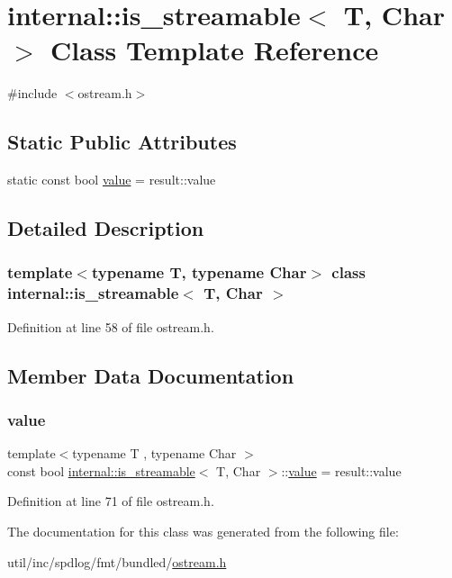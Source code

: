\hypertarget{classinternal_1_1is__streamable}{}\section{internal\+:\+:is\+\_\+streamable$<$ T, Char $>$ Class Template Reference}
\label{classinternal_1_1is__streamable}


{\ttfamily \#include $<$ostream.\+h$>$}

\subsection*{Static Public Attributes}
\begin{DoxyCompactItemize}
\item 
static const bool \hyperlink{classinternal_1_1is__streamable_afc01f41166c453d140b52f96020f32b5}{value} = result\+::value
\end{DoxyCompactItemize}


\subsection{Detailed Description}
\subsubsection*{template$<$typename T, typename Char$>$\newline
class internal\+::is\+\_\+streamable$<$ T, Char $>$}



Definition at line 58 of file ostream.\+h.



\subsection{Member Data Documentation}
\mbox{\label{classinternal_1_1is__streamable_afc01f41166c453d140b52f96020f32b5}} 
\subsubsection{\texorpdfstring{value}{value}}
{\footnotesize\ttfamily template$<$typename T , typename Char $>$ \\
const bool \hyperlink{classinternal_1_1is__streamable}{internal\+::is\+\_\+streamable}$<$ T, Char $>$\+::\hyperlink{classinternal_1_1value}{value} = result\+::value\hspace{0.3cm}{\ttfamily [static]}}



Definition at line 71 of file ostream.\+h.



The documentation for this class was generated from the following file\+:\begin{DoxyCompactItemize}
\item 
util/inc/spdlog/fmt/bundled/\hyperlink{ostream_8h}{ostream.\+h}\end{DoxyCompactItemize}
